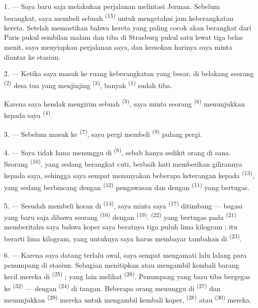1. --- Saya baru saja melakukan perjalanan melintasi Jerman. Sebelum
berangkat, saya membeli sebuah 
\textsuperscript{(15)} untuk mengetahui jam keberangkatan kereta.
Setelah memastikan bahwa kereta yang paling cocok akan berangkat dari
Paris pukul sembilan malam dan tiba di Strasburg pukul satu lewat tiga
belas menit, saya menyiapkan perjalanan saya, dan keesokan harinya
saya minta diantar ke stasiun.

2. --- Ketika saya masuk ke ruang keberangkatan yang besar, di
belakang seorang  \textsuperscript{(2)} desa tua yang
menjinjing  \textsuperscript{(3)}, banyak
 \textsuperscript{(1)} sudah tiba.

Karena saya hendak mengirim sebuah 
\textsuperscript{(5)}, saya minta seorang 
\textsuperscript{(6)} menunjukkan kepada saya 
\textsuperscript{(4)}.

3. --- Sebelum masuk ke  \textsuperscript{(7)},
saya pergi membeli  \textsuperscript{(9)} pulang pergi.

4. --- Saya tidak lama menunggu di 
\textsuperscript{(8)}, sebab hanya sedikit orang di sana. Seorang
 \textsuperscript{(10)}, yang sedang berangkat cuti,
berbaik hati memberikan gilirannya kepada saya, sehingga saya sempat
menanyakan beberapa keterangan kepada 
\textsuperscript{(13)}, yang sedang berbincang dengan
 \textsuperscript{(12)} pengawasan dan dengan
 \textsuperscript{(11)} yang bertugas.

\VUsaut{3.0mm}

5. --- Sesudah membeli koran di 
\textsuperscript{(14)}, saya minta  saya
\textsuperscript{(17)} ditimbang — bagasi yang baru saja dibawa
seorang  \textsuperscript{(16)} dengan  \textsuperscript{(19)}. 
\textsuperscript{(22)} yang bertugas pada 
\textsuperscript{(21)} memberitahu saya bahwa koper saya beratnya tiga
puluh lima kilogram ; itu berarti  lima
kilogram, yang untuknya saya harus membayar tambahan di  \textsuperscript{(23)}.

6. --- Karena saya datang terlalu awal, saya sempat mengamati lalu
lalang para penumpang di stasiun. Sebagian menitipkan atau mengambil
kembali barang kecil mereka di 
\textsuperscript{(25)} ; yang lain melihat 
\textsuperscript{(26)}. Penumpang yang baru tiba bergegas ke
 \textsuperscript{(32)} — dengan 
\textsuperscript{(24)} di tangan. Beberapa orang menunggu di
 \textsuperscript{(27)} dan
menunjukkan  \textsuperscript{(29)} mereka untuk mengambil
kembali koper,  \textsuperscript{(28)} atau
 \textsuperscript{(30)} mereka.

